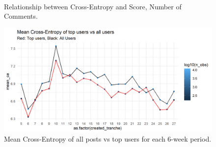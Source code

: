 \begin{figure}[h]%

    \centering

     ~
    
    \caption{Relationship between Cross-Entropy and Score, Number of Comments.}%

    \label{fig:ce_stats}%

\end{figure}


\begin{figure}[h]%

    \centering

    \includegraphics[width=\linewidth]{figures/comp_ce_plot.png}
    \caption{Mean Cross-Entropy of all posts vs top users for each 6-week period.}%

    \label{fig:ce_comp}%

\end{figure}




